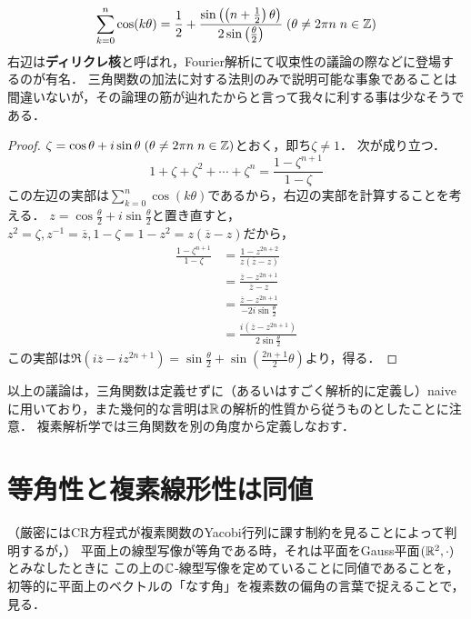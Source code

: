 \documentclass[uplatex, dvipdfmx]{jsreport}
\begin{document}
\begin{proposition}
    \[ \sum^n_{k=0}\cos(k\theta)=\frac{1}{2}+\frac{\sin\left(\left(n+\frac{1}{2}\right)\theta\right)}{2\sin\left(\frac{\theta}{2}\right)}\;(\theta\ne 2\pi n\;n\in\mathbb{Z}) \]
    右辺は\textbf{ディリクレ核}と呼ばれ，Fourier解析にて収束性の議論の際などに登場するのが有名．
    三角関数の加法に対する法則のみで説明可能な事象であることは間違いないが，その論理の筋が辿れたからと言って我々に利する事は少なそうである．
\end{proposition}
\begin{proof}
    $\zeta=\cos\theta+i\sin\theta\;(\theta\ne 2\pi n\;n\in\mathbb{Z})$とおく，即ち$\zeta\ne 1$．
    次が成り立つ．
    \[ 1+\zeta+\zeta^2+\cdots+\zeta^n=\frac{1-\zeta^{n+1}}{1-\zeta} \]
    この左辺の実部は$\sum^n_{k=0}\cos(k\theta)$であるから，右辺の実部を計算することを考える．
    $z=\cos\frac{\theta}{2}+i\sin\frac{\theta}{2}$と置き直すと，$z^2=\zeta, z^{-1}=\overline{z}, 1-\zeta=1-z^2=z(\overline{z}-z)$だから，
    \begin{align*}
        \frac{1-\zeta^{n+1}}{1-\zeta}&=\frac{1-z^{2n+2}}{z(\overline{z}-z)}\\
        &= \frac{\overline{z}-z^{2n+1}}{\overline{z}-z}\\
        &= \frac{\overline{z}-z^{2n+1}}{-2i\sin\frac{\theta}{2}}\\
        &= \frac{i(\overline{z}-z^{2n+1})}{2\sin\frac{\theta}{2}}
    \end{align*}
    この実部は$\Re(i\overline{z}-iz^{2n+1})=\sin\frac{\theta}{2}+\sin\left(\frac{2n+1}{2}\theta\right)$より，得る．
\end{proof}

\begin{remark}[公理論としての厳密性についての注意]
    以上の議論は，三角関数は定義せずに（あるいはすごく解析的に定義し）naiveに用いており，また幾何的な言明は$\mathbb{R}$の解析的性質から従うものとしたことに注意．\cite{Ahlfors}
    複素解析学では三角関数を別の角度から定義しなおす．
\end{remark}

\section{等角性と複素線形性は同値}

\begin{screen}
    （厳密にはCR方程式が複素関数のYacobi行列に課す制約を見ることによって判明するが，）
    平面上の線型写像が等角である時，それは平面をGauss平面$(\mathbb{R}^2,\cdot)$とみなしたときに
    この上の$\mathbb{C}$-線型写像を定めていることに同値であることを，初等的に平面上のベクトルの「なす角」を複素数の偏角の言葉で捉えることで，見る．
\end{screen}
\end{document}
